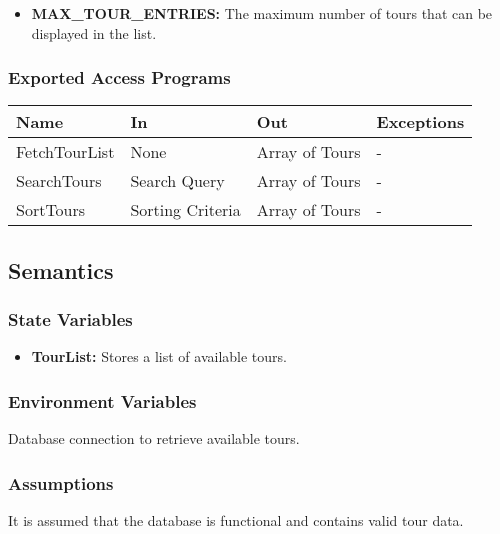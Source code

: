 \documentclass[12pt, titlepage]{article}
\begin{document}
\begin{itemize}
    \item \textbf{MAX\_TOUR\_ENTRIES:} The maximum number of tours that can be displayed in the list.
\end{itemize}

\subsubsection{Exported Access Programs}

\begin{center}
\begin{tabular}{p{4cm} p{4cm} p{4cm} p{4cm}}
\hline
\textbf{Name} & \textbf{In} & \textbf{Out} & \textbf{Exceptions} \\
\hline
FetchTourList & None & Array of Tours & - \\
\hline
SearchTours & Search Query & Array of Tours & - \\
\hline
SortTours & Sorting Criteria & Array of Tours & - \\
\hline
\end{tabular}
\end{center}

\subsection{Semantics}

\subsubsection{State Variables}

\begin{itemize}
    \item \textbf{TourList:} Stores a list of available tours.
\end{itemize}

\subsubsection{Environment Variables}

Database connection to retrieve available tours.

\subsubsection{Assumptions}

It is assumed that the database is functional and contains valid tour data.
\end{document}
